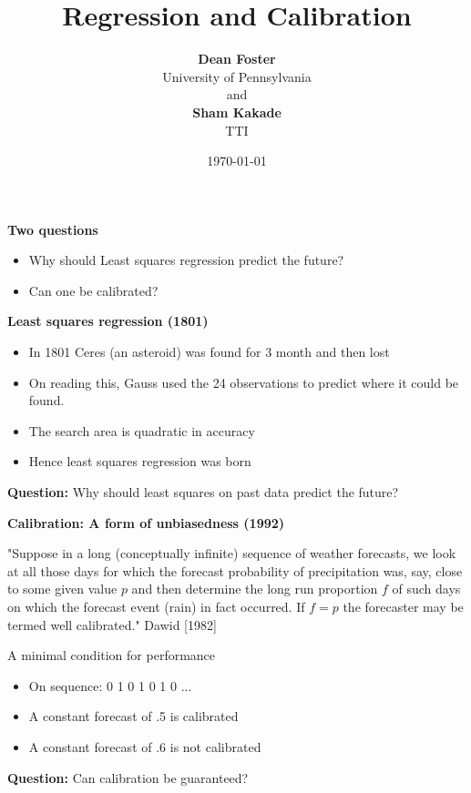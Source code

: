 \documentclass[landscape]{slides}
\author{{\bf Dean Foster}\\ University of Pennsylvania\\ $\quad$ \\ and \\
$\quad$ \\ {\bf Sham
Kakade} \\ TTI}
\title{Regression and Calibration}
\date{\today}
\begin{document}
\newcommand{\foilhead}[1]{\newpage\centerline{\color{red} \bf #1}}

\maketitle



\foilhead{Two questions}

\begin{itemize}
\item Why should Least squares regression predict the future? 
\item Can one be calibrated?
\end{itemize}


\foilhead{Least squares regression (1801)}
\begin{itemize}
\item In 1801 Ceres (an asteroid) was found for 3 month and then lost
\item On reading this, Gauss used the 24 observations to predict where
it could be found. 
\item The search area is quadratic in accuracy
\item Hence least squares regression was born
\end{itemize}
{\bf  Question:} Why should least squares on past data predict
the future?


\foilhead{Calibration: A form of unbiasedness (1992)}

"Suppose in a long (conceptually infinite) sequence of weather
 forecasts, we look at all those days for which the forecast
 probability of precipitation was, say, close to some given value $p$
 and then determine the long run proportion $f$ of such days on which
 the forecast event (rain) in fact occurred.  If $f=p$ the forecaster
 may be termed well calibrated." Dawid [1982]

A minimal condition for performance
\begin{itemize}
\item On sequence: 0 1 0 1 0 1 0 ...
\item A constant forecast of .5 is calibrated
\item A constant forecast of .6 is not calibrated
\end{itemize}
{\bf  Question:} Can calibration be guaranteed?
\end{document}
